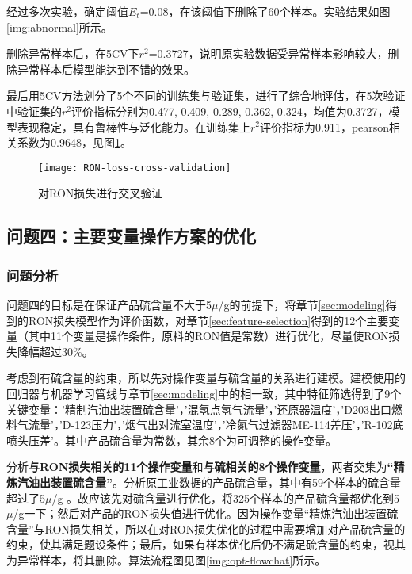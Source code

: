 \documentclass[bwprint]{gmcmthesis}
\begin{document}
经过多次实验，确定阈值$E_t$=0.08，在该阈值下删除了60个样本。实验结果如图\ref{img:abnormal}所示。

删除异常样本后，在5CV下$r^2$=0.3727，说明原实验数据受异常样本影响较大，删除异常样本后模型能达到不错的效果。

最后用5CV方法划分了5个不同的训练集与验证集，进行了综合地评估，在5次验证中验证集的$r^2$评价指标分别为0.477, 0.409, 0.289, 0.362, 0.324，均值为0.3727，模型表现稳定，具有鲁棒性与泛化能力。在训练集上$r^2$评价指标为0.911，pearson相关系数为0.9648，见图\ref{RON-loss-cv}。

\begin{figure}[htb]
	\centering
	\texttt{[image: RON-loss-cross-validation]}
	\caption{对RON损失进行交叉验证}
	\label{RON-loss-cv}
\end{figure}



\FloatBarrier
\subsection{问题四：主要变量操作方案的优化}

\FloatBarrier
\subsubsection{问题分析}\label{sec:opt-problem-analyze}



问题四的目标是在保证产品硫含量不大于5$\mu$/g的前提下，将章节\ref{sec:modeling}得到的RON损失模型作为评价函数，对章节\ref{sec:feature-selection}得到的12个主要变量（其中11个变量是操作条件，原料的RON值是常数）进行优化，尽量使RON损失降幅超过30\%。


考虑到有硫含量的约束，所以先对操作变量与硫含量的关系进行建模。建模使用的回归器与机器学习管线与章节\ref{sec:modeling}中的相一致，其中特征筛选得到了9个关键变量：'精制汽油出装置硫含量'，'混氢点氢气流量'，'还原器温度'，'D203出口燃料气流量'，'D-123压力'，'烟气出对流室温度'，'冷氮气过滤器ME-114差压'，'R-102底喷头压差'。其中产品硫含量为常数，其余8个为可调整的操作变量。

分析\textbf{与RON损失相关的11个操作变量}和\textbf{与硫相关的8个操作变量}，两者交集为\textbf{“精炼汽油出装置硫含量”}。分析原工业数据的产品硫含量，其中有59个样本的硫含量超过了5$\mu$/g 。故应该先对硫含量进行优化，将325个样本的产品硫含量都优化到5$\mu$/g一下；然后对产品的RON损失值进行优化。因为操作变量“精炼汽油出装置硫含量”与RON损失相关，所以在对RON损失优化的过程中需要增加对产品硫含量的约束，使其满足题设条件；最后，如果有样本优化后仍不满足硫含量的约束，视其为异常样本，将其删除。算法流程图见图\ref{img:opt-flowchat}所示。
\end{document}
